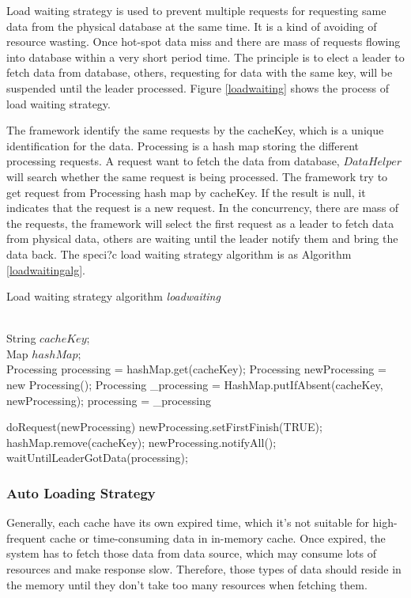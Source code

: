 \documentclass{singlecol-new}
\theoremstyle{TH}{
\newtheorem{lemma}{Lemma}
\newtheorem{theorem}[lemma]{Theorem}
\newtheorem{corrolary}[lemma]{Corrolary}
\newtheorem{conjecture}[lemma]{Conjecture}
\newtheorem{proposition}[lemma]{Proposition}
\newtheorem{claim}[lemma]{Claim}
\newtheorem{stheorem}[lemma]{Wrong Theorem}
}
\theoremstyle{THrm}{
\newtheorem{definition}{Definition}[section]
\newtheorem{question}{Question}[section]
\newtheorem{remark}{Remark}
\newtheorem{scheme}{Scheme}
}
\theoremstyle{THhit}{
\newtheorem{case}{Case}[section]
}
\begin{document}
Load waiting strategy is used to prevent multiple requests for requesting same data from the physical database at the same time. It is a kind of avoiding of resource wasting. Once hot-spot data miss and there are mass of requests flowing into database within a very short period time. The principle is to elect a leader to fetch data from database, others, requesting for data with the same key, will be suspended until the leader processed. Figure \ref{loadwaiting} shows the process of load waiting strategy.

The framework identify the same requests by the cacheKey, which is a unique identification for the data. Processing is a hash map storing the different processing requests. A request want to fetch the data from database, $DataHelper$ will search whether the same request is being processed. The framework try to get request from Processing hash map by cacheKey. If the result is null, it indicates that the request is a new request. In the concurrency, there are mass of the requests, the framework will select the first request as a leader to fetch data from physical data, others are waiting until the leader notify them and bring the data back. The speci?c load waiting strategy algorithm is as Algorithm \ref{loadwaitingalg}.

\begin{algorithm}
\caption{Load waiting strategy algorithm \textit{loadwaiting}}
\label{loadwaitingalg}
\begin{algorithmic}[1]
\REQUIRE ~~\\
  String $cacheKey$;\\
  Map $hashMap$;
\ENSURE ~~\\

\STATE Processing processing = hashMap.get(cacheKey);
\STATE Processing newProcessing = new Processing();
\STATE Processing \_processing = HashMap.putIfAbsent(cacheKey, newProcessing);
\STATE processing = \_processing
\ENDIF
\ENDIF

\STATE doRequest(newProcessing)
\STATE newProcessing.setFirstFinish(TRUE);
\STATE hashMap.remove(cacheKey);
\STATE newProcessing.notifyAll();
\ELSE
\STATE waitUntilLeaderGotData(processing);
\ENDIF


\RETURN

\medskip

\end{algorithmic}
\end{algorithm}

\subsubsection{Auto Loading Strategy}
Generally, each cache have its own expired time, which it's not suitable for high-frequent cache or time-consuming data in in-memory cache. Once expired, the system has to fetch those data from data source, which may consume lots of resources and make response slow. Therefore, those types of data should reside in the memory until they don't take too many resources when fetching them.
\end{document}
